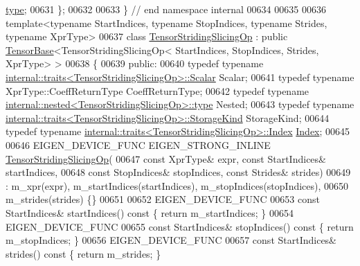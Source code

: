 \begin{DoxyCode}
       \hyperlink{class_eigen_1_1_tensor_striding_slicing_op}{type};
00631 \};
00632 
00633 \}  \textcolor{comment}{// end namespace internal}
00634 
00635 
00636 \textcolor{keyword}{template}<\textcolor{keyword}{typename} StartIndices, \textcolor{keyword}{typename} StopIndices, \textcolor{keyword}{typename} Str\textcolor{keywordtype}{id}es, \textcolor{keyword}{typename} XprType>
00637 \textcolor{keyword}{class }\hyperlink{class_eigen_1_1_tensor_striding_slicing_op}{TensorStridingSlicingOp} : \textcolor{keyword}{public} \hyperlink{class_eigen_1_1_tensor_base}{TensorBase}<TensorStridingSlicingOp<
      StartIndices, StopIndices, Strides, XprType> >
00638 \{
00639   \textcolor{keyword}{public}:
00640   \textcolor{keyword}{typedef} \textcolor{keyword}{typename} \hyperlink{struct_eigen_1_1internal_1_1traits}{internal::traits<TensorStridingSlicingOp>::Scalar}
       Scalar;
00641   \textcolor{keyword}{typedef} \textcolor{keyword}{typename} XprType::CoeffReturnType CoeffReturnType;
00642   \textcolor{keyword}{typedef} \textcolor{keyword}{typename} \hyperlink{class_eigen_1_1internal_1_1_tensor_lazy_evaluator_writable}{internal::nested<TensorStridingSlicingOp>::type}
       Nested;
00643   \textcolor{keyword}{typedef} \textcolor{keyword}{typename} \hyperlink{struct_eigen_1_1internal_1_1traits}{internal::traits<TensorStridingSlicingOp>::StorageKind}
       StorageKind;
00644   \textcolor{keyword}{typedef} \textcolor{keyword}{typename} \hyperlink{struct_eigen_1_1internal_1_1traits}{internal::traits<TensorStridingSlicingOp>::Index}
       \hyperlink{namespace_eigen_a62e77e0933482dafde8fe197d9a2cfde}{Index};
00645 
00646   EIGEN\_DEVICE\_FUNC EIGEN\_STRONG\_INLINE \hyperlink{class_eigen_1_1_tensor_striding_slicing_op}{TensorStridingSlicingOp}(
00647     \textcolor{keyword}{const} XprType& expr, \textcolor{keyword}{const} StartIndices& startIndices,
00648     \textcolor{keyword}{const} StopIndices& stopIndices, \textcolor{keyword}{const} Strides& strides)
00649       : m\_xpr(expr), m\_startIndices(startIndices), m\_stopIndices(stopIndices),
00650         m\_strides(strides) \{\}
00651 
00652     EIGEN\_DEVICE\_FUNC
00653     \textcolor{keyword}{const} StartIndices& startIndices()\textcolor{keyword}{ const }\{ \textcolor{keywordflow}{return} m\_startIndices; \}
00654     EIGEN\_DEVICE\_FUNC
00655     \textcolor{keyword}{const} StartIndices& stopIndices()\textcolor{keyword}{ const }\{ \textcolor{keywordflow}{return} m\_stopIndices; \}
00656     EIGEN\_DEVICE\_FUNC
00657     \textcolor{keyword}{const} StartIndices& strides()\textcolor{keyword}{ const }\{ \textcolor{keywordflow}{return} m\_strides; \}

\end{DoxyCode}
